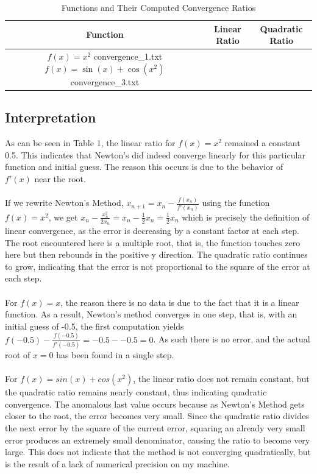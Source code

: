 \documentclass[12pt]{article}
\makeatletter
\def\expinput#1{\@@input#1 }
\makeatother
\begin{document}
\begin{table}[H]
\centering
\begin{tabular}{c|c|c}
\toprule
Function & Linear Ratio & Quadratic Ratio \\
\midrule
$f(x)=x^2$ 
\expinput{convergence_1.txt}
\midrule
$f(x)=\sin(x)+\cos(x^2)$
\expinput{convergence_3.txt}
\bottomrule
\end{tabular}
\caption{Functions and Their Computed Convergence Ratios}
\label{tab:1}
\end{table}

\subsection{Interpretation} 
As can be seen in Table 1, the linear ratio for $f(x) = x^2$ remained a constant 0.5. This indicates that Newton's did indeed converge linearly for this particular function and initial guess. The reason this occurs is due to the behavior of $f'(x)$ near the root. \\\\If we rewrite Newton's Method, $x_{n+1} = x_n - \frac{f(x_n)}{f'(x_n)}$ using the function \\$f(x) = x^2$, we get $x_n - \frac{x^2_n}{2x_n} = x_n - \frac{1}{2}x_n = \frac{1}{2}x_n$ which is precisely the definition of linear convergence, as the error is decreasing by a constant factor at each step. The root encountered here is a multiple root, that is, the function touches zero here but then rebounds in the positive y direction. The quadratic ratio continues to grow, indicating that the error is not proportional to the square of the error at each step. \\\\For $f(x) = x$, the reason there is no data is due to the fact that it is a linear function. As a result, Newton's method converges in one step, that is, with an initial guess of -0.5, the first computation yields \\$f(-0.5) - \frac{f(-0.5)}{f'(-0.5)} = -0.5 - -0.5 = 0$. As such there is no error, and the actual root of $x = 0$ has been found in a single step. \\ \\For $f(x) = sin(x) + cos(x^2)$, the linear ratio does not remain constant, but the quadratic ratio remains nearly constant, thus indicating quadratic convergence. The anomalous last value occurs because as Newton's Method gets closer to the root, the error becomes very small. Since the quadratic ratio divides the next error by the square of the current error, squaring an already very small error produces an extremely small denominator, causing the ratio to become very large. This does not indicate that the method is not converging quadratically, but is the result of a lack of numerical precision on my machine.
\end{document}
